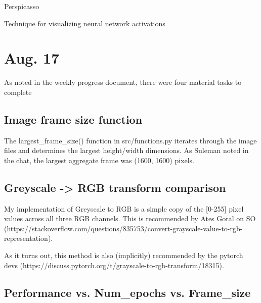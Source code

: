 \documentclass[12pt,letterpaper]{article}
\begin{document}
\sloppy
\vspace*{\fill}
\begin{center}\Large%
Perspicasso\\
\end{center}
\vspace*{\fill}
\newpage


Technique for visualizing neural network activations\cite{samek2015evaluating}

\section*{Aug. 17}
As noted in the weekly progress document, there were four material tasks to complete

\subsection*{Image frame size function}

The largest_frame_size() function in src/functions.py iterates through the image files and determines the largest height/width dimensions. As Suleman noted in the chat, the largest aggregate frame was (1600, 1600) pixels.


\subsection*{Greyscale -> RGB transform comparison }

My implementation of Greyscale to RGB is a simple copy of the [0-255] pixel values across all three RGB channels. This is recommended by Ates Goral on SO (https://stackoverflow.com/questions/835753/convert-grayscale-value-to-rgb-representation).

As it turns out, this method is also (implicitly) recommended by the pytorch devs (https://discuss.pytorch.org/t/grayscale-to-rgb-transform/18315).

\subsection*{Performance vs. Num_epochs vs. Frame_size}


\newpage


\end{document}
